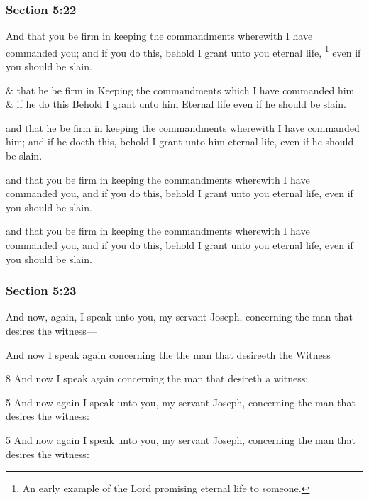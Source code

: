 	\subsubsection{Section 5:22} %
		\label{DC5-22}

		And that you be firm in keeping the commandments wherewith I have commanded you; and if you do this, behold I grant unto you eternal life,%
			\footnote{%
				An early example of the Lord promising eternal life to someone.
				}
		even if you should be slain.

		\begin{framed}
		\scriptsize
			\begin{compactdesc}
				\item[JSP] \& that he be firm in Keeping the commandments which I have commanded him \& if he do this Behold I grant unto him Eternal life even if he should be slain.
				\item[RB1] [\textit{missing}]
				\item[BC] and that he be firm in keeping the commandments wherewith I have commanded him; and if he doeth this, behold I grant unto him eternal life, even if he should be slain.
				\item[DC 1835] and that you be firm in keeping the commandments wherewith I have commanded you, and if you do this, behold I grant unto you eternal life, even if you should be slain.
				\item[DC 1844] and that you be firm in keeping the commandments wherewith I have commanded you, and if you do this, behold I grant unto you eternal life, even if you should be slain.
			\end{compactdesc}
		\end{framed}

	\subsubsection{Section 5:23} %
		\label{DC5-23}

		And now, again, I speak unto you, my servant Joseph, concerning the man that desires the witness---

		\begin{framed}
		\scriptsize
			\begin{compactdesc}
				\item[JSP] And now I speak again concerning the \sout{the} man that desireeth the Witness
				\item[RB1] [\textit{missing}]
				\item[BC] 8 And now I speak again concerning the man that desireth a witness: 
				\item[DC 1835] 5 And now again I speak unto you, my servant Joseph, concerning the man that desires the witness:
				\item[DC 1844] 5 And now again I speak unto you, my servant Joseph, concerning the man that desires the witness:
			\end{compactdesc}
		\end{framed}

